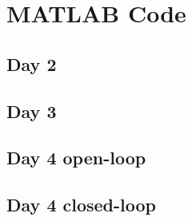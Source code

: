 \section{MATLAB Code}\label{sec:matlab}

\subsection{Day 2}\label{code:day2}


\newpage
\subsection{Day 3}\label{code:day3}


\newpage
\subsection{Day 4 open-loop}\label{code:day4_ol}


\newpage
\subsection{Day 4 closed-loop}\label{code:day4_cl}
